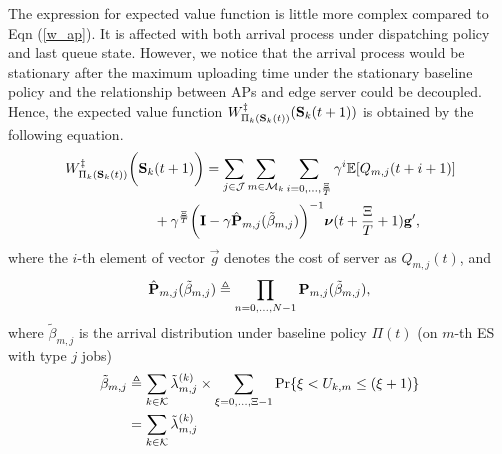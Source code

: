 The expression for expected value function is little more complex compared to Eqn (\ref{w_ap}).
It is affected with both arrival process under dispatching policy and last queue state.
However, we notice that the arrival process would be stationary after the maximum uploading time under the stationary baseline policy and the relationship between APs and edge server could be decoupled.
Hence, the expected value function $W^{\ddagger}_{\Pi_{k}(\mathbf{S}_{k}(t))}(\mathbf{S}_{k}(t+1))$ is obtained by the following equation.
{\small
\begin{align}
    &W^{\ddagger}_{\Pi_{k}(\mathbf{S}_{k}(t))}\bigg(\mathbf{S}_{k}(t+1)\bigg)
    = \sum_{j\in\mathcal{J}}\sum_{m\in\mathcal{M}_{k}}\sum_{i=0,\dots,\frac{\Xi}{T}} \gamma^{i} \mathbb{E}[ Q_{m,j}({t+i+1}) ]
    \nonumber\\
    &~~~~~~~~~~~~~~~~~~~+ \gamma^{\frac{\Xi}{T}} \bigg( \mathbf{I} - \gamma \hat{\mathbf{P}}_{m,j}(\tilde{\beta}_{m,j}) \bigg)^{-1} \boldsymbol{\nu}({t+\frac{\Xi}{T}+1}) \mathbf{g}',
\end{align}   
}
where the $i$-th element of vector $\vec{g}$ denotes the cost of server as $Q_{m,j}(t)$, and
\begin{align}
    \hat{\mathbf{P}}_{m,j}(\tilde{\beta}_{m,j}) \triangleq \prod_{n=0,\dots,N-1} \mathbf{P}_{m,j}(\tilde{\beta}_{m,j}),
\end{align}
where $\tilde{\beta}_{m,j}$ is the arrival distribution under baseline policy $\Pi(t)$ (on $m$-th ES with type $j$ jobs)
\begin{align}
    \tilde{\beta}_{m,j} &\triangleq \sum_{k\in\mathcal{K}} \tilde{\lambda}^{(k)}_{m,j} \times \sum_{\xi=0,\dots,\Xi-1} \Pr\{ \xi<U_{k,m}\leq(\xi+1) \}
        \nonumber\\
    ~~~~&= \sum_{k\in\mathcal{K}} \tilde{\lambda}^{(k)}_{m,j}
\end{align}

